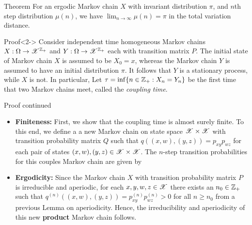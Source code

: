 \documentclass[12pt,aspectratio=169]{beamer}
\begin{document}
\begin{frame}
\begin{block}{Theorem} 
For an ergodic Markov chain $X$ with invariant distribution $\pi$, and $n$th step distribution $\mu(n)$, we have $\lim_{n \to \infty}\mu(n) = \pi$ in the total variation distance. 
\end{block}

\begin{block}{Proof}<2->
Consider independent time homogeneous Markov chains $X: \Omega \to \mathscr{X}^{\mathbb{Z}_+}$ and $Y: \Omega \to \mathscr{X}^{\mathbb{Z}_+}$ each with transition matrix $P$. 
The initial state of Markov chain $X$ is assumed to be $X_0 = x$, whereas the Markov chain $Y$ is assumed to have an initial distribution $\pi$. 
It follows that $Y$ is a stationary process, while $X$ is not. 
In particular, 
Let $\tau = \inf\{n \in \mathbb{Z}_+: X_n = Y_n\}$ be the first time that two Markov chains meet, called the \textit{coupling time}. \\
\end{block}
\end{frame}

\begin{frame}
\begin{block}{Proof continued}
\begin{itemize}
\item \textbf{Finiteness:} First, we show that the coupling time is almost surely finite. 
To this end, we define a a new Markov chain on state space $\mathscr{X} \times \mathscr{X}$ with transition probability matrix $Q$ such that $q((x,w), (y,z)) = p_{xy}p_{wz}$ for each pair of states $(x,w), (y,z) \in \mathscr{X} \times \mathscr{X}$. 
The $n$-step transition probabilities for this couples Markov chain are given by 
\item<2-> \textbf{Ergodicity:} Since the Markov chain $X$ with transition probability matrix $P$ is irreducible and aperiodic, for each $x,y,w,z \in \mathscr{X}$ there exists an $n_0 \in \mathbb{Z}_+$ such that $q^{(n)}((x,w), (y,z)) = p^{(n)}_{xy}p^{(n)}_{wz} > 0$ for all $n \ge n_0$ from a previous Lemma on aperiodicity. Hence, the irreducibility and aperiodicity of this new \textbf{product} Markov chain follows. 
\end{itemize}
\end{block}
\end{frame}
\end{document}
